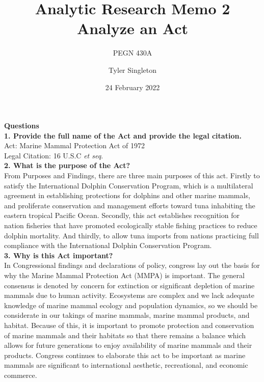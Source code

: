 \documentclass[12pt]{article}
\title{Analytic Research Memo 2\\
Analyze an Act}
\subtitle{PEGN 430A}
\author{Tyler Singleton}
\date{24 February 2022}
\begin{document}
\maketitle

\newpage
\setlength{\parindent}{0pt}

\textbf{Questions} \\

\textbf{1. Provide the full name of the Act and provide the legal citation.} \\

Act: 
Marine Mammal Protection Act of 1972 
\\

Legal Citation:
16 U.S.C  \textit{et seq}.
\\

\textbf{2. What is the purpose of the Act?} \\

From  Purposes and Findings, there are three main purposes of this act. Firstly to satisfy the International Dolphin Conservation Program, which is a multilateral agreement in establishing protections for dolphins and other marine mammals, and proliferate conservation and management efforts toward tuna inhabiting the eastern tropical Pacific Ocean. Secondly, this act establishes recognition for nation fisheries that have promoted ecologically stable fishing practices to reduce dolphin mortality. And thirdly, to allow tuna imports from nations practicing full compliance with the International Dolphin Conservation Program.
 \\

\textbf{3. Why is this Act important?} \\

In  Congressional findings and declarations of policy, congress lay out the basis for why the Marine Mammal Protection Act (MMPA) is important. The general consensus is denoted by concern for extinction or significant depletion of marine mammals due to human activity. Ecosystems are complex and we lack adequate knowledge of marine mammal ecology and population dynamics, so we should be considerate in our takings of marine mammals, marine mammal products, and habitat. Because of this, it is important to promote protection and conservation of marine mammals and their habitats so that there remains a balance which allows for future generations to enjoy availability of marine mammals and their products. Congress continues to elaborate this act to be important as marine mammals are significant to international aesthetic, recreational, and economic commerce.
\\
\end{document}
